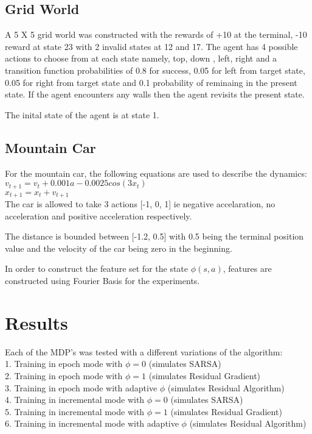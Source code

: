 \documentclass[fleqn]{article}
\begin{document}
\subsection*{Grid World}
A 5 X 5 grid world was constructed with the rewards of +10 at the terminal, -10 reward at state 23 with 2 invalid states at 12 and 17. The agent has 4 possible actions to choose from at each state namely, top, down , left, right and a transition function probabilities of 0.8 for success, 0.05 for left from target state, 0.05 for right from target state and 0.1 probability of reminaing in the present state. If the agent encounters any walls then the agent revisits the present state.

The inital state of the agent is at state 1.

\subsection*{Mountain Car}
For the mountain car, the following equations are used to describe the dynamics:\\
$v_{t+1} = v_t + 0.001a - 0.0025cos(3x_t)$\\ 
$x_{t+1} = x_t + v_{t+1}$\\

The car is allowed to take 3 actions [-1, 0, 1] ie negative accelaration, no acceleration and positive acceleration respectively.

The distance is bounded between [-1.2, 0.5] with 0.5 being the terminal position value and the velocity of the car being zero in the beginning.

In order to construct the feature set for the state $\phi(s,a)$, features are constructed using Fourier Basis for the experiments. 


\section*{Results}
Each of the MDP's was tested with a different variations of the algorithm:\\
1. Training in epoch mode with $\phi = 0$ (simulates SARSA)\\
2. Training in epoch mode with $\phi = 1$ (simulates Residual Gradient)\\
3. Training in epoch mode with adaptive $\phi$ (simulates Residual Algorithm)\\
4. Training in incremental mode with $\phi = 0$ (simulates SARSA)\\
5. Training in incremental mode with $\phi = 1$ (simulates Residual Gradient)\\
6. Training in incremental mode with adaptive $\phi$ (simulates Residual Algorithm)\\
\end{document}
